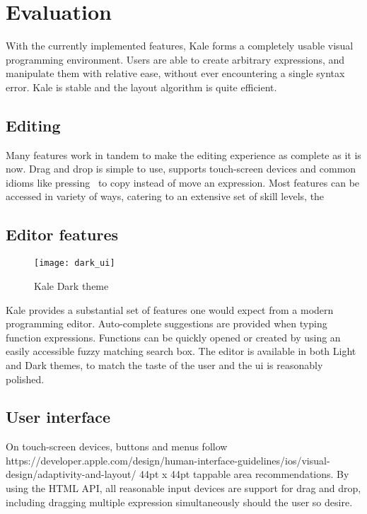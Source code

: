 \chapter{Evaluation}

With the currently implemented features, Kale forms a completely
usable visual programming environment. Users are able to create
arbitrary expressions, and manipulate them with relative ease, without
ever encountering a single syntax error. Kale is stable and the layout
algorithm is quite efficient.

\section{Editing}
Many features work in tandem to make the editing experience as complete as it
is now. Drag and drop is simple to use, supports touch-screen devices and
common idioms like pressing~\keys{\ctrl} to copy instead of move an expression.
Most features can be accessed in variety of ways, catering to an extensive
set of skill levels, the 


\section{Editor features}
\begin{wrapfigure}[11]{r}{8cm}
\texttt{[image: dark\_ui]}	
\caption{Kale Dark theme}
\end{wrapfigure}

Kale provides a substantial set of features one would expect from a modern
programming editor. Auto-complete suggestions are provided when typing
function expressions. Functions can be quickly opened or created by using an
easily accessible fuzzy matching search box. The editor is available in both
Light and Dark themes, to match the taste of the user and the \ac{ui} is
reasonably polished.

\section{User interface}
On touch-screen devices, buttons and menus follow
{https://developer.apple.com/design/human-interface-guidelines/ios/visual-design/adaptivity-and-layout/}
44pt x 44pt tappable area recommendations. By using the HTML
 API,
all reasonable input devices are support for drag and drop, including dragging
multiple expression simultaneously should the user so desire.

